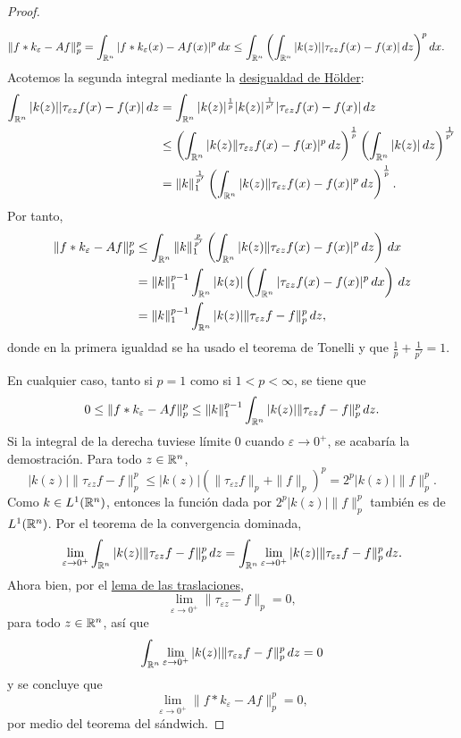 \documentclass[a4paper, 11pt, oneside]{report}
\begin{document}
\begin{proof}
\begin{enumerate}
    \[\begin{aligned}[t]
      \|f \ast k_\varepsilon - Af\|_p^p &= \int_{\mathbb R^n} |f \ast k_\varepsilon(x) - Af(x)|^p \, dx \leq \int_{\mathbb R^n}\left(\int_{\mathbb R^n}|k(z)| |\tau_{\varepsilon z}f(x) - f(x)| \, dz\right)^p dx.
    \end{aligned}\]
    Acotemos la segunda integral mediante la \hyperref[teo:1.2.6]{\color{c1}desigualdad de Hölder}:
    \[\begin{aligned}[t]
      \int_{\mathbb R^n}|k(z)| |\tau_{\varepsilon z}f(x) - f(x)| \, dz &= \int_{\mathbb R^n}|k(z)|^{\frac{1}{p}}|k(z)|^{\frac{1}{p'}} |\tau_{\varepsilon z}f(x) - f(x)| \, dz \\
      &\leq \left(\int_{\mathbb R^n} |k(z)\|\tau_{\varepsilon z}f(x) - f(x)|^p \, dz\right)^\frac{1}{p}\left(\int_{\mathbb R^n} |k(z)| \, dz\right)^{\frac{1}{p'}} \\
      &= \|k\|_1^{\frac{1}{p'}}\left(\int_{\mathbb R^n} |k(z)\|\tau_{\varepsilon z}f(x) - f(x)|^p \, dz\right)^\frac{1}{p}.
    \end{aligned}\]
    Por tanto,
    \[\begin{aligned}[t]
      \|f \ast k_\varepsilon - Af\|_p^p &\leq \int_{\mathbb R^n} \|k\|_1^{\frac{p}{p'}}\left(\int_{\mathbb R^n} |k(z)\|\tau_{\varepsilon z}f(x) - f(x)|^p \, dz\right) \, dx \\
      &= \|k\|_1^{p-1} \int_{\mathbb R^n} |k(z)| \left(\int_{\mathbb R^n} |\tau_{\varepsilon z}f(x) - f(x)|^p \, dx\right) \, dz \\
      &= \|k\|_1^{p-1} \int_{\mathbb R^n} |k(z)| \|\tau_{\varepsilon z}f - f\|_p^p \, dz, \\
    \end{aligned}\]
    donde en la primera igualdad se ha usado el teorema de Tonelli y que $\frac{1}{p}+\frac{1}{p'} = 1$.
  \end{enumerate}
  En cualquier caso, tanto si $p = 1$ como si $1 < p <\infty$, se tiene que
  \[0 \leq \|f \ast k_\varepsilon - Af\|_p^p \leq \|k\|_1^{p-1} \int_{\mathbb R^n} |k(z)| \|\tau_{\varepsilon z}f - f\|_p^p \, dz.\]
  Si la integral de la derecha tuviese límite $0$ cuando $\varepsilon \to 0^+$, se acabaría la demostración. Para todo $z \in \mathbb R^n$,
  \[|k(z)| \|\tau_{\varepsilon z}f-f\|_p^p \leq |k(z)| \left(\|\tau_{\varepsilon z}f\|_p + \|f\|_p\right)^p = 2^p |k(z)| \|f\|_p^p.\]
  Como $k \in L^1(\mathbb R^n)$, entonces la función dada por $2^p |k(z)| \|f\|_p^p$ también es de $L^1(\mathbb R^n)$. Por el teorema de la convergencia dominada,
  \[\lim_{\varepsilon \to 0^+} \int_{\mathbb R^n} |k(z)| \|\tau_{\varepsilon z}f - f\|_p^p \, dz = \int_{\mathbb R^n} \lim_{\varepsilon \to 0^+}|k(z)| \|\tau_{\varepsilon z}f - f\|_p^p \, dz.\]
  Ahora bien, por el \hyperref[teo:1.11.2]{\color{c1}lema de las traslaciones},
  \[\lim_{\varepsilon  \to 0^+}\|\tau_{\varepsilon z} - f\|_p = 0,\]
  para todo $z \in \mathbb R^n$, así que
  \[\int_{\mathbb R^n} \lim_{\varepsilon \to 0^+}|k(z)| \|\tau_{\varepsilon z}f - f\|_p^p \, dz = 0\]
  y se concluye que
  \[\lim_{\varepsilon \to 0^+}\|f \ast k_\varepsilon - Af\|_p^p = 0,\]
  por medio del teorema del sándwich.
\end{proof}
\end{document}
